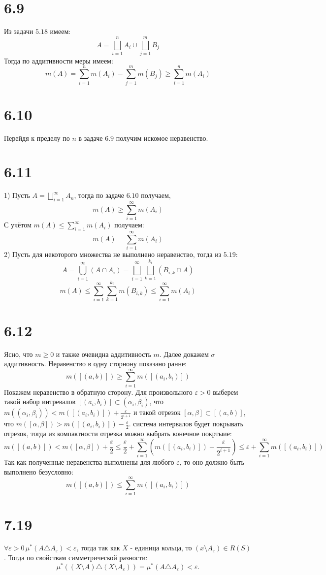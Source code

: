 \documentclass[12pt]{article}
\begin{document}
\section{6.9}
Из задачи $5.18$ имеем:
\[
    A = \bigsqcup_{i=1}^{n} A_i \cup \bigsqcup_{j=1}^{m} B_j
\]
Тогда по аддитивности меры имеем:
\[
    m(A) = \sum_{i=1}^{n} m(A_i) - \sum_{j=1}^{m} m(B_j) \geq \sum_{i=1}^{n} m(A_i)
\]
\section{6.10}
Перейдя к пределу по $n$ в задаче $6.9$ получим искомое неравенство.
\section{6.11}
1) Пусть $A = \bigsqcup_{i=1}^{\infty} A_n$, тогда по задаче $6.10$ получаем,
\[
    m(A) \geq \sum_{i=1}^{\infty} m(A_i)
\]
С учётом $m(A) \leq \sum_{i=1}^{\infty} m(A_i)$ получаем:
\[
    m(A) = \sum_{i=1}^{\infty} m(A_i)
\]
2) Пусть для некоторого множества не выполнено неравенство, тогда из $5.19$:
\[
    A = \bigcup_{i=1}^{\infty} (A \cap A_i) = \bigsqcup_{i=1}^{\infty} \bigsqcup_{k=1}^{k_i} (B_{i, k} \cap A)
\]
\[
    m(A) \leq \sum_{i=1}^{\infty} \sum_{k=1}^{k_i} m(B_{i, k}) \leq \sum_{i=1}^{\infty} m(A_i)
\]
\section{6.12}
Ясно, что $m \geq 0$ и также очевидна аддитивность $m$. Далее докажем $\sigma$ аддитивность. 
Неравенство в одну сторнону показано ранне: 
\[
    m([(a, b)]) \geq \sum_{i=1}^{\infty} m([(a_i, b_i)])
\]
Покажем неравенство в обратную сторону. Для произвольного $\varepsilon > 0$ 
выберем такой набор интревалов $[(a_i, b_i)] \subset (\alpha_i, \beta_i)$, что 
$m((\alpha_i, \beta_i)) < m([(a_i, b_i)]) + \frac{\varepsilon}{2^{i+1}}$ и такой отрезок $[\alpha, \beta] \subset [(a, b)]$, что 
$m([\alpha, \beta]) > m([(a_i, b_i)]) - \frac{\varepsilon}{2}$. система интервалов будет покрывать 
отрезок, тогда из компактности отрезка можно выбрать конечное покртыие: 
\[
    m([(a, b)]) < m([\alpha, \beta])  +\frac{\varepsilon}{2} \leq 
    \frac{\varepsilon}{2} + \sum_{i=1}^{\infty} \left( m([(a_i, b_i)]) + \frac{\varepsilon}{2^{i+1}} \right) \leq \varepsilon + 
    \sum_{i=1}^{\infty} m([(a_i, b_i)])
\]     
Так как полученные неравенства выполнены для любого $\varepsilon$, то оно должно быть выполнено безусловно: 
\[
    m([(a, b)]) \leq \sum_{i=1}^{\infty} m([(a_i, b_i)])
\] 
\section{7.19}
$\forall \varepsilon > 0 \, \mu^{\ast} (A \triangle A_{\varepsilon}) < \varepsilon$, тогда так как $X$ - единица кольца, то
$(x \setminus A_{\varepsilon}) \in R(S)$. Тогда по свойствам симметрической разности:
\[
    \mu^{\ast}  ((X \setminus A) \triangle (X \setminus A_{\varepsilon} )) = \mu^{\ast}  (A \triangle A_{\varepsilon} )< \varepsilon.
\]
\end{document}
